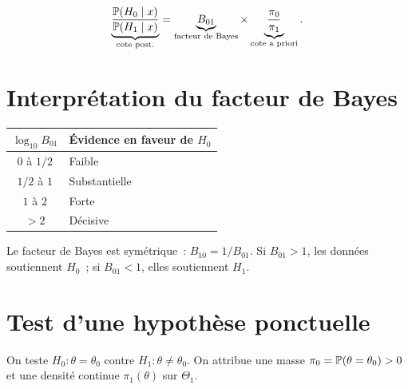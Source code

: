 \begin{formules}[title=\textbf{Rapport des cotes a posteriori}]
\[
  \underbrace{\frac{\mathbb{P}(H_0 \mid x)}{\mathbb{P}(H_1 \mid x)}}_{\text{cote post.}}
  = \underbrace{B_{01}}_{\text{facteur de Bayes}}
  \times
  \underbrace{\frac{\pi_0}{\pi_1}}_{\text{cote a priori}}.
\]
\end{formules}

\section{Interpr\'etation du facteur de Bayes}

\begin{formules}[title=\textbf{\'Echelle de Jeffreys pour $B_{01}$}]
\begin{center}
\renewcommand{\arraystretch}{1.3}
\begin{tabular}{cl}
\toprule
$\log_{10} B_{01}$ & \textbf{\'Evidence en faveur de $H_0$} \\
\midrule
$0$ \`a $1/2$ & Faible \\
$1/2$ \`a $1$ & Substantielle \\
$1$ \`a $2$ & Forte \\
$> 2$ & D\'ecisive \\
\bottomrule
\end{tabular}
\end{center}
\end{formules}

\begin{remarque}
Le facteur de Bayes est sym\'etrique~: $B_{10} = 1/B_{01}$.
Si $B_{01} > 1$, les donn\'ees soutiennent $H_0$~;
si $B_{01} < 1$, elles soutiennent $H_1$.
\end{remarque}

\section{Test d'une hypoth\`ese ponctuelle}

\begin{definition}
On teste $H_0 : \theta = \theta_0$ contre $H_1 : \theta \neq \theta_0$.
On attribue une masse $\pi_0 = \mathbb{P}(\theta = \theta_0) > 0$ et une
densit\'e continue $\pi_1(\theta)$ sur $\Theta_1$.
\end{definition}

